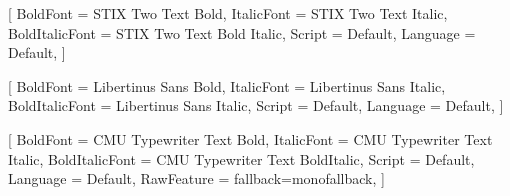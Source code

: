 
\usepackage[
  papersize={170mm,240mm},
  inner=18mm,
  outer=20mm,
  bindingoffset=10mm,
  top=25mm,
  bottom=28mm,
  headheight=0pt,
  headsep=0pt,
  footskip=13mm,
  heightrounded,
]{geometry}
\usepackage[strict]{changepage}

\raggedbottom



\usepackage{fontspec}


\setmainfont{STIX Two Text}[
  BoldFont       = STIX Two Text Bold,
  ItalicFont     = STIX Two Text Italic,
  BoldItalicFont = STIX Two Text Bold Italic,
  Script         = Default,
  Language       = Default,
]

\setsansfont{Libertinus Sans}[
  BoldFont       = Libertinus Sans Bold,
  ItalicFont     = Libertinus Sans Italic,
  BoldItalicFont = Libertinus Sans Italic, %
  Script         = Default,
  Language       = Default,
]


\setmonofont{CMU Typewriter Text}[
  BoldFont       = CMU Typewriter Text Bold,
  ItalicFont     = CMU Typewriter Text Italic,
  BoldItalicFont = CMU Typewriter Text BoldItalic,
  Script         = Default,
  Language       = Default,
  RawFeature     = {fallback=monofallback},
]




\usepackage{amsmath}
\usepackage{amsthm}
\usepackage{mathtools}
\usepackage{unicode-math}




